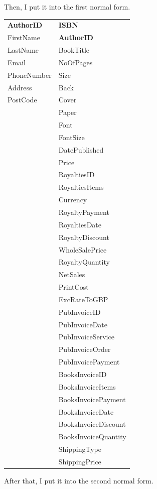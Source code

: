 \newpage
Then, I put it into the first normal form.

\begin{tabular}{|p{2.5cm}|p{3.5cm}|}
    \hline
    \textbf{AuthorID} & \textbf{ISBN} \\
    FirstName & \textbf{AuthorID} \\
    LastName & BookTitle \\
    Email & NoOfPages \\
    PhoneNumber & Size \\
    Address & Back \\
    PostCode & Cover \\
    & Paper \\
    & Font \\
    & FontSize \\
    & DatePublished\\
    & Price \\
    & RoyaltiesID \\
    & RoyaltiesItems \\
    & Currency \\
    & RoyaltyPayment \\
    & RoyaltiesDate \\
    & RoyaltyDiscount \\
    & WholeSalePrice \\
    & RoyaltyQuantity \\
    & NetSales \\
    & PrintCost \\
    & ExcRateToGBP \\
    & PubInvoiceID \\
    & PubInvoiceDate \\
    & PubInvoiceService \\
    & PubInvoiceOrder \\
    & PubInvoicePayment \\
    & BooksInvoiceID \\
    & BooksInvoiceItems \\
    & BooksInvoicePayment \\
    & BooksInvoiceDate \\
    & BooksInvoiceDiscount \\
    & BooksInvoiceQuantity \\
    & ShippingType \\
    & ShippingPrice \\
    \hline
\end{tabular}

\newpage
After that, I put it into the second normal form.

